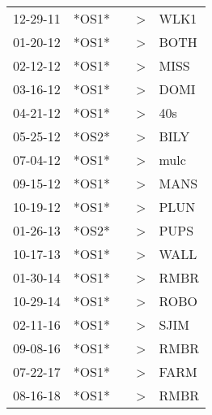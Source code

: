 \begin{supertabular}{lllll}
 12-29-11 &  *OS1* &   &  \textgreater &  WLK1 \\
 01-20-12 &  *OS1* &   &  \textgreater &  BOTH \\
 02-12-12 &  *OS1* &   &  \textgreater &  MISS \\
 03-16-12 &  *OS1* &   &  \textgreater &  DOMI \\
 04-21-12 &  *OS1* &   &  \textgreater &   40s \\
 05-25-12 &  *OS2* &   &  \textgreater &  BILY \\
 07-04-12 &  *OS1* &   &  \textgreater &  mulc \\
 09-15-12 &  *OS1* &   &  \textgreater &  MANS \\
 10-19-12 &  *OS1* &   &  \textgreater &  PLUN \\
 01-26-13 &  *OS2* &   &  \textgreater &  PUPS \\
 10-17-13 &  *OS1* &   &  \textgreater &  WALL \\
 01-30-14 &  *OS1* &   &  \textgreater &  RMBR \\
 10-29-14 &  *OS1* &   &  \textgreater &  ROBO \\
 02-11-16 &  *OS1* &   &  \textgreater &  SJIM \\
 09-08-16 &  *OS1* &   &  \textgreater &  RMBR \\
 07-22-17 &  *OS1* &   &  \textgreater &  FARM \\
 08-16-18 &  *OS1* &   &  \textgreater &  RMBR \\
\end{supertabular}
